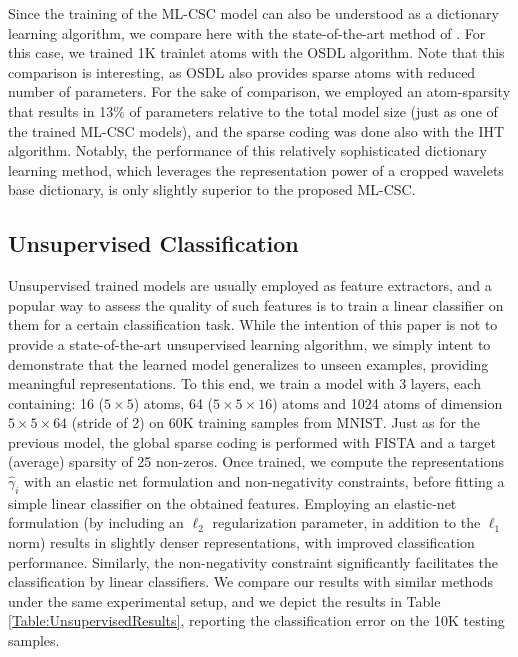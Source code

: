 \documentclass[10pt,journal]{IEEEtran}
\theoremstyle{plain}
\theoremstyle{definition}
\begin{document}
Since the training of the ML-CSC model can also be understood as a dictionary learning algorithm, we compare here with the state-of-the-art method of \cite{Sulam2016}. For this case, we trained 1K trainlet atoms with the OSDL algorithm. Note that this comparison is interesting, as OSDL also provides sparse atoms with reduced number of parameters. For the sake of comparison, we employed an atom-sparsity that results in 13$\%$ of parameters relative to the total model size (just as one of the trained ML-CSC models), and the sparse coding was done also with the IHT algorithm. Notably, the performance of this relatively sophisticated dictionary learning method, which leverages the representation power of a cropped wavelets base dictionary, is only slightly superior to the proposed ML-CSC.


\subsection{Unsupervised Classification}

Unsupervised trained models are usually employed as feature extractors, and a popular way to assess the quality of such features is to train a linear classifier on them for a certain classification task. While the intention of this paper is not to provide a state-of-the-art unsupervised learning algorithm, we simply intent to demonstrate that the learned model generalizes to unseen examples, providing meaningful representations. To this end, we train a model with 3 layers, each containing: 16 ($5\times5$) atoms, 64 ($5\times5\times16$) atoms and 1024 atoms of dimension $5\times5\times64$ (stride of 2) on 60K training samples from MNIST. Just as for the previous model, the global sparse coding is performed with FISTA and a target (average) sparsity of 25 non-zeros. Once trained, we compute the representations $\hat{\gamma}_i$ with an elastic net formulation and non-negativity constraints, before fitting a simple linear classifier on the obtained features. 
Employing an elastic-net formulation (by including an $\ell_2$ regularization parameter, in addition to the $\ell_1$ norm) results in slightly denser representations, with improved classification performance. Similarly, the non-negativity constraint significantly facilitates the classification by linear classifiers. We compare our results with similar methods under the same experimental setup, and we depict the results in Table \ref{Table:UnsupervisedResults}, reporting the classification error on the 10K testing samples. 
\end{document}

